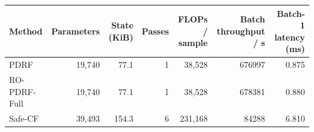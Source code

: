 \begin{tabular}{lrrrrrr}
\toprule
Method & Parameters & State (KiB) & Passes & FLOPs / sample & Batch throughput / s & Batch-1 latency (ms) \\
\midrule
PDRF & 19,740 & 77.1 & 1 & 38,528 & 676997 & 0.875 \\
RO-PDRF-Full & 19,740 & 77.1 & 1 & 38,528 & 678381 & 0.880 \\
Safe-CF & 39,493 & 154.3 & 6 & 231,168 & 84288 & 6.810 \\
\bottomrule
\end{tabular}
